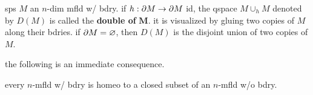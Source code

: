 \begin{xmp}[title=Double of a Manifold with Boundary,source=Primary Source Material]
    sps $M$ an $n$-dim mfld w/ bdry. if $h:\partial M\rightarrow\partial M$ id, the qspace
    $M\cup_{h}M$ denoted by $D(M)$ is called the \textbf{double of} $\bm{M}$. it
    is visualized by gluing two copies of $M$ along their bdries. if
    $\partial M = \varnothing$, then $D(M)$ is the disjoint union of two copies of $M$.
\end{xmp}
the following is an immediate consequence.

\begin{prop}
    every $n$-mfld w/ bdry is homeo to a closed subset of an $n$-mfld w/o bdry.
\end{prop}



